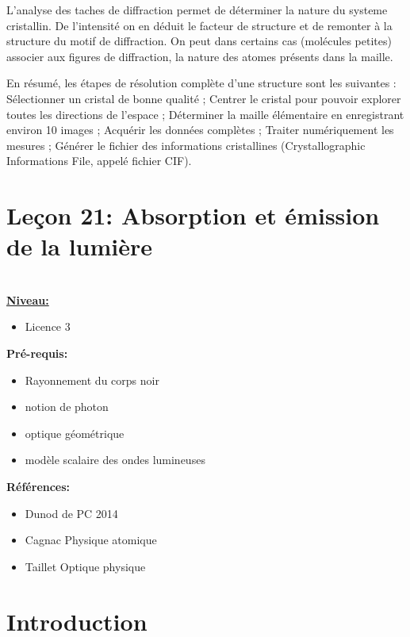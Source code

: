 \documentclass[french, a4paper, 10pt, twocolumn, landscape]{article}
\begin{document}
L'analyse des taches de diffraction permet de déterminer la nature du systeme cristallin. De l'intensité on en déduit le facteur de structure et de remonter à la structure du motif de diffraction.  On peut dans certains cas (molécules petites) associer aux figures de diffraction, la nature des atomes présents dans la maille.

En résumé, les étapes de résolution complète d'une structure sont les suivantes :
Sélectionner un cristal de bonne qualité ;
Centrer le cristal pour pouvoir explorer toutes les directions de l'espace ;
Déterminer la maille élémentaire en enregistrant environ 10 images ;
Acquérir les données complètes ;
Traiter numériquement les mesures ;
Générer le fichier des informations cristallines (Crystallographic Informations File, appelé fichier CIF).

\clearpage 

\section*{Leçon 21: Absorption et émission de la lumière}

\hrulefill\\

\noindent\underline{\textbf{Niveau:}} 
\begin{itemize}
    \item Licence 3
\end{itemize}

\textbf{Pré-requis:}
\begin{itemize}
    \item  Rayonnement du corps noir
    \item notion de photon
    \item optique géométrique
    \item modèle scalaire des ondes lumineuses
\end{itemize}

\textbf{Références:}\medskip

\begin{itemize}
\item Dunod de PC 2014
\item Cagnac Physique atomique
\item Taillet Optique physique
\end{itemize}

\hrulefill


\section*{Introduction}
\end{document}
